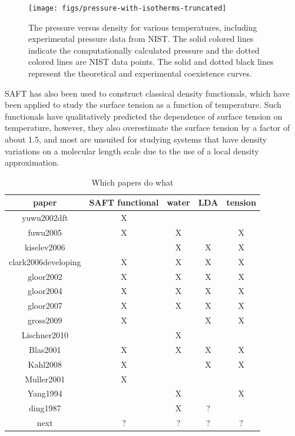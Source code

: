 \documentclass[letterpaper,twocolumn,amsmath,amssymb,prb]{revtex4-1}
\begin{document}
\begin{figure}
\begin{center}
\texttt{[image: figs/pressure-with-isotherms-truncated]}
\end{center}
\caption{The pressure versus density for various temperatures, including
experimental pressure data from NIST\cite{nistwater}. The solid colored lines
indicate the computationally calculated pressure and the dotted
colored lines are NIST data points. The solid and dotted black lines
represent the theoretical and experimental coexistence curves.}
\label{fig:pressure-with-isotherms}
\end{figure}

SAFT has also been used to construct classical density functionals,
which have been applied to study the surface tension as a function of
temperature\cite{clark2006developing, gloor2004accurate,
  gloor2007prediction, blas2001examination, gloor2002saft}.  Such
functionals have qualitatively predicted the dependence of surface
tension on temperature, however, they also overestimate
the surface tension by a factor of about 1.5, and most are unsuited
for studying systems that have density variations on a molecular
length scale due to the use of a local density
approximation\cite{gloor2002saft,clark2006developing, gloor2007prediction,
gloor2004accurate, gross2009density, kahl2008modified, blas2001examination}.

\begin{table}
\begin{tabular}{|c|c|c|c|c|}
\hline
paper & SAFT functional & water & LDA & tension \\
\hline
yuwu2002dft & X & & & \\
\hline
fuwu2005 & X & X & & X \\
\hline
kiselev2006 &  & X & X & X \\
\hline
clark2006developing & X & X & X & X \\
\hline
gloor2002 & X & X & X & X \\
\hline
gloor2004 & X & X & X & X \\
\hline
gloor2007 & X & X & X & X \\
\hline
gross2009 & X &  & X & X \\
\hline
Lischner2010 &  & X &  &  \\
\hline
Blas2001 & X & X & X & X \\
\hline
Kahl2008 & X &  & X & X \\
\hline
Muller2001 & X &  &  &  \\
\hline
Yang1994 &  & X &  & X \\
\hline
ding1987 &  & X & ? &  \\
\hline
next & ? & ? & ? & ? \\
\hline
\end{tabular}
\caption{Which papers do what}
\end{table}
\end{document}
